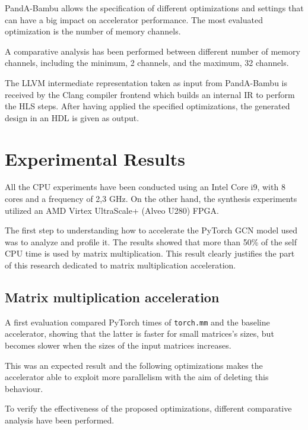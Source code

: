 \documentclass[11pt,a4paper,twocolumn]{article}
\begin{document}
PandA-Bambu allows the specification of different optimizations and settings that can have a big impact on accelerator performance.
The most evaluated optimization is the number of memory channels.

A comparative analysis has been performed between different number of memory channels, including the minimum, 2 channels, and the maximum, 32 channels.

The LLVM intermediate representation taken as input from PandA-Bambu is received by the Clang compiler frontend which builds an internal IR to perform the HLS steps.
After having applied the specified optimizations, the generated design in an HDL is given as output.


\section{Experimental Results}
\label{sec:experimental-results}%

All the CPU experiments have been conducted using an Intel Core i9, with 8 cores and a frequency of 2,3 GHz.
On the other hand, the synthesis experiments utilized an AMD Virtex UltraScale+ (Alveo U280) FPGA\@.

The first step to understanding how to accelerate the PyTorch GCN model used was to analyze and profile it.
The results showed that more than 50\% of the self CPU time is used by matrix multiplication.
This result clearly justifies the part of this research dedicated to matrix multiplication acceleration.

\subsection{Matrix multiplication acceleration}
\label{subsec:matmul}%

A first evaluation compared PyTorch times of \lstinline{torch.mm} and the baseline accelerator, showing that the latter is faster for small matrices's sizes, but becomes slower when the sizes of the input matrices increases.

This was an expected result and the following optimizations makes the accelerator able to exploit more parallelism with the aim of deleting this behaviour.

To verify the effectiveness of the proposed optimizations, different comparative analysis have been performed.
\end{document}
